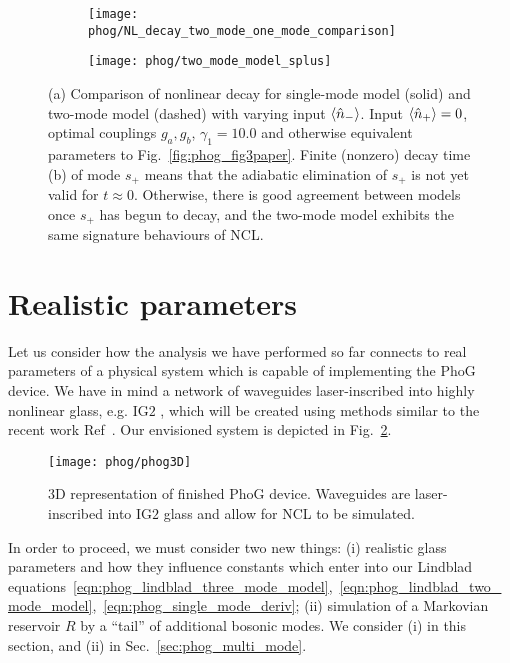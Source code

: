 \begin{figure}[htp]
\captionsetup{width=0.8\linewidth}
\centering
	\begin{subfigure}{0.7\linewidth}
	\caption{}
	\texttt{[image: phog/NL\_decay\_two\_mode\_one\_mode\_comparison]}
	\end{subfigure}
	\begin{subfigure}{0.7\linewidth}
	\centering
	\caption{}
	\texttt{[image: phog/two\_mode\_model\_splus]}
	\end{subfigure}
\caption{\label{fig:phog_two_mode_single_mode_comparison} (a) Comparison of nonlinear decay for single-mode model (solid) and two-mode model (dashed) with varying input $\ev{\hat{n}_-}$. Input $\ev{\hat{n}_+} = 0$, optimal couplings $g_a, g_b$, $\gamma_1 = 10.0$ and otherwise equivalent parameters to Fig.~\ref{fig:phog_fig3paper}. Finite (nonzero) decay time (b) of mode $s_+$ means that the adiabatic elimination of $s_+$ is not yet valid for $t \approx 0$. Otherwise, there is good agreement between models once $s_+$ has begun to decay, and the two-mode model exhibits the same signature behaviours of NCL.}
\end{figure}

\clearpage
\section{Realistic parameters}\label{sec:parameters}

Let us consider how the analysis we have performed so far connects to real parameters of a physical system which is capable of implementing the PhoG device. We have in mind a network of waveguides laser-inscribed into highly nonlinear glass, e.g. IG$2$ \cite{ig2}, which will be created using methods similar to the recent work Ref~\cite{Mukherjee2017}. Our envisioned system is depicted in Fig.~\ref{fig:phog_realistic}.

\begin{figure}[htp]
\captionsetup{width=0.8\linewidth}
\centering
\texttt{[image: phog/phog3D]}
\caption{\label{fig:phog_realistic} $3$D representation of finished PhoG device. Waveguides are laser-inscribed into IG$2$ glass and allow for NCL to be simulated.}
\end{figure}

In order to proceed, we must consider two new things: (i) realistic glass parameters and how they influence constants which enter into our Lindblad equations~\ref{eqn:phog_lindblad_three_mode_model},~\ref{eqn:phog_lindblad_two_mode_model},~\ref{eqn:phog_single_mode_deriv}; (ii) simulation of a Markovian reservoir $R$ by a ``tail'' of additional bosonic modes. We consider (i) in this section, and (ii) in Sec.~\ref{sec:phog_multi_mode}.

